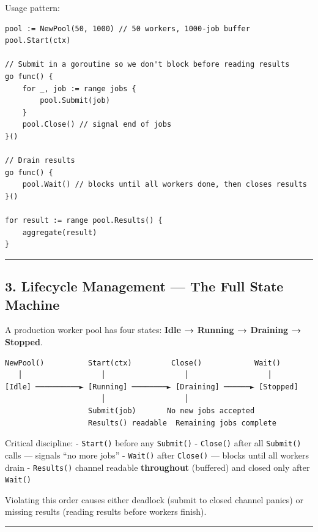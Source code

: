 \documentclass[11pt,a4paper,oneside]{book}
\begin{document}
Usage pattern:

\begin{verbatim}
pool := NewPool(50, 1000) // 50 workers, 1000-job buffer
pool.Start(ctx)

// Submit in a goroutine so we don't block before reading results
go func() {
    for _, job := range jobs {
        pool.Submit(job)
    }
    pool.Close() // signal end of jobs
}()

// Drain results
go func() {
    pool.Wait() // blocks until all workers done, then closes results
}()

for result := range pool.Results() {
    aggregate(result)
}
\end{verbatim}

\begin{center}\rule{0.5\linewidth}{0.5pt}\end{center}

\subsection{3. Lifecycle Management --- The Full State
Machine}

A production worker pool has four states: \textbf{Idle → Running →
Draining → Stopped}.

\begin{verbatim}
NewPool()          Start(ctx)         Close()            Wait()
   │                  │                  │                  │
[Idle] ──────────► [Running] ────────► [Draining] ──────► [Stopped]
                      │                  │
                   Submit(job)       No new jobs accepted
                   Results() readable  Remaining jobs complete
\end{verbatim}

Critical discipline: - \texttt{Start()} before any \texttt{Submit()} -
\texttt{Close()} after all \texttt{Submit()} calls --- signals ``no more
jobs'' - \texttt{Wait()} after \texttt{Close()} --- blocks until all
workers drain - \texttt{Results()} channel readable \textbf{throughout}
(buffered) and closed only after \texttt{Wait()}

Violating this order causes either deadlock (submit to closed channel
panics) or missing results (reading results before workers finish).

\begin{center}\rule{0.5\linewidth}{0.5pt}\end{center}
\end{document}
